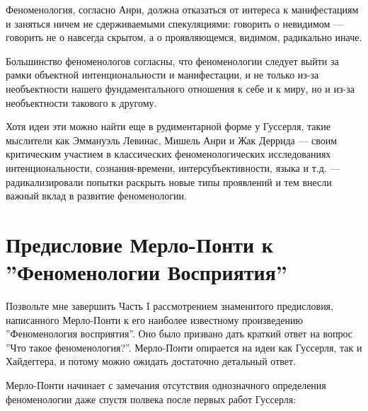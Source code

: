 \documentclass[11pt]{book}
\begin{document}
\relax
{}\relax
\smallskip

Феноменология, согласно Анри, должна отказаться от интереса к манифестациям и заняться ничем не сдерживаемыми спекуляциями: говорить о невидимом --- говорить не о навсегда скрытом, а о проявляющемся, видимом, радикально иначе.

Большинство феноменологов согласны, что феноменологии следует выйти за рамки объектной интенциональности и манифестации, и не только из-за необъектности нашего фундаментального отношения к себе и к миру, но и из-за необъектности такового к другому.

Хотя идеи эти можно найти еще в рудиментарной форме у Гуссерля, такие мыслители как Эммануэль Левинас, Мишель Анри и Жак Деррида --- своим критическим участием в классических феноменологических исследованиях интенциональности, сознания-времени, интерсубъективности, языка и т.д. --- радикализировали попытки раскрыть новые типы проявлений и тем внесли важный вклад в развитие феноменологии.

\chapter{Предисловие Мерло-Понти к ''Феноменологии Восприятия''}

Позвольте мне завершить Часть I рассмотрением знаменитого предисловия, написанного Мерло-Понти к его наиболее известному произведению ''Феноменология восприятия''. Оно было призвано дать краткий ответ на вопрос ''Что такое феноменология?''. Мерло-Понти опирается на идеи как Гуссерля, так и Хайдеггера, и потому можно ожидать достаточно детальный ответ.

Мерло-Понти начинает с замечания отсутствия однозначного определения феноменологии даже спустя полвека после первых работ Гуссерля:
\end{document}
